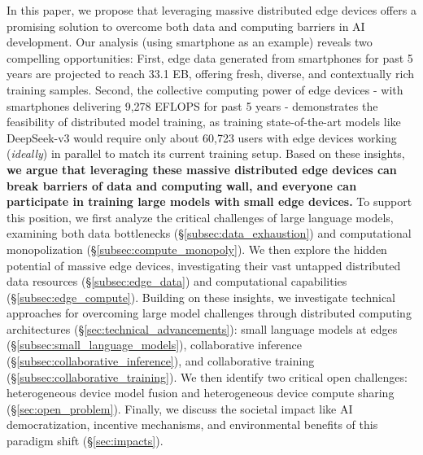 In this paper, we propose that leveraging massive distributed edge devices offers a promising solution to overcome both data and computing barriers in AI development. 
Our analysis (using smartphone as an example) reveals two compelling opportunities: 
First, edge data generated from smartphones for past 5 years are projected to reach 33.1 EB, offering fresh, diverse, and contextually rich training samples. 
Second, the collective computing power of edge devices - with smartphones delivering 9,278 EFLOPS for past 5 years - demonstrates the feasibility of distributed model training, as training state-of-the-art models like DeepSeek-v3 would require only about 60,723 users with edge devices working (\textit{ideally}) in parallel to match its current training setup. 
Based on these insights, \textbf{we argue that leveraging these massive distributed edge devices can break barriers of data and computing wall, and everyone can participate in training large models with small edge devices.} 
To support this position, we first analyze the critical challenges of large language models, examining both data bottlenecks (\S\ref{subsec:data_exhaustion}) and computational monopolization (\S\ref{subsec:compute_monopoly}). 
We then explore the hidden potential of massive edge devices, investigating their vast untapped distributed data resources (\S\ref{subsec:edge_data}) and computational capabilities (\S\ref{subsec:edge_compute}). 
Building on these insights, we investigate technical approaches for overcoming large model challenges through distributed computing architectures (\S\ref{sec:technical_advancements}): small language models at edges (\S\ref{subsec:small_language_models}), collaborative inference (\S\ref{subsec:collaborative_inference}), and collaborative training (\S\ref{subsec:collaborative_training}).
We then identify two critical open challenges: heterogeneous device model fusion and heterogeneous device compute sharing (\S\ref{sec:open_problem}). 
Finally, we discuss the societal impact like AI democratization, incentive mechanisms, and environmental benefits of this paradigm shift (\S\ref{sec:impacts}).

